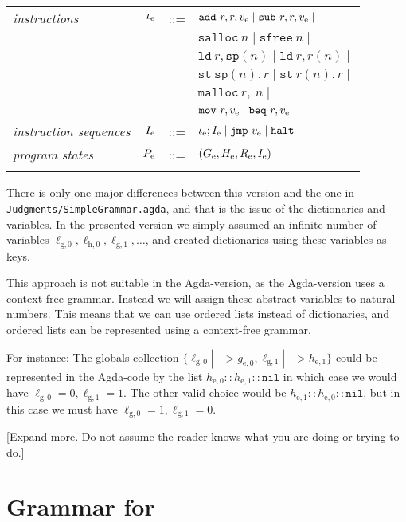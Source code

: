 {\begin{tabular}{lrcl}
\textit{instructions} & ${\iota_{\mathrm{e}}}$ & ::= & $\mathtt{add}\ r, r, \simple v \mid \mathtt{sub}\ r, r, \simple v \mid$ \\
        &&& $\mathtt{salloc}\ n \mid \mathtt{sfree}\ n \mid$ \\
        &&& $\mathtt{ld}\ r, \mathtt{sp}(n) \mid \mathtt{ld}\ r, r(n) \mid$ \\
        &&& $\mathtt{st}\ \mathtt{sp}(n), r \mid \mathtt{st}\ r(n), r \mid$ \\
        &&& $\mathtt{malloc}\ r,\ n \mid $ \\
        &&& $\mathtt{mov}\ r, \simple v \mid \mathtt{beq}\ r, \simple v$ \\
\textit{instruction sequences} & ${I_{\mathrm{e}}}$ & ::= & ${\iota_{\mathrm{e}}} ; {I_{\mathrm{e}}} \mid \mathtt{jmp}\ {v_{\mathrm{e}}} \mid \mathtt{halt}$ \\
\textit{program states} & ${P_{\mathrm{e}}}$ & ::= & $({G_{\mathrm{e}}}, {H_{\mathrm{e}}}, {R_{\mathrm{e}}}, {I_{\mathrm{e}}})$ \\\\
\end{tabular}
}

There is only one major differences between this version and the one in
\texttt{Judgments/SimpleGrammar.agda}, and that is the issue of the dictionaries
and variables. In the presented version we simply assumed an infinite number of
variables
$\ell_{\mathrm{g},0}, \ell_{\mathrm{h},0}, \ell_{\mathrm{g},1}, \dots$, and
created dictionaries using these variables as keys.

This approach is not suitable in the Agda-version, as the Agda-version uses a
context-free grammar. Instead we will assign these abstract variables to natural
numbers. This means that we can use ordered lists instead of dictionaries, and
ordered lists can be represented using a context-free grammar.

For instance: The globals collection
$\{\ell_{\mathrm{g},0} |-> g_{\mathrm{e},0}, \ell_{\mathrm{g},1} |->
h_{\mathrm{e},1}\}$ could be represented in the Agda-code by the list
$h_{\mathrm{e},0} :: h_{\mathrm{e},1} :: \mathtt{nil}$ in which case we would
have $\ell_{\mathrm{g},0} = 0, \ell_{\mathrm{g},1} = 1$. The other valid choice
would be $h_{\mathrm{e},1} :: h_{\mathrm{e},0} :: \mathtt{nil}$, but in this
case we must have $\ell_{\mathrm{g},0} = 1, \ell_{\mathrm{g},1} = 0$.

[Expand more. Do not assume the reader knows what you are doing or trying to do.]

\section{Grammar for \ATAL}

